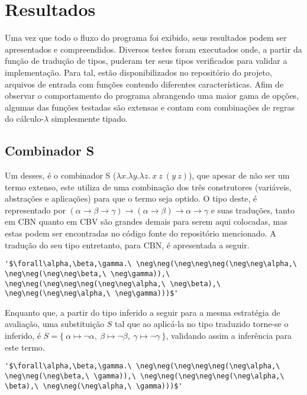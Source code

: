 \section{Resultados}\label{sec:resultados}
Uma vez que todo o fluxo do programa foi exibido, seus resultados podem ser apresentados e compreendidos.
Diversos testes foram executados onde, a partir da função de tradução de tipos, puderam ter seus tipos verificados para validar a implementação.
Para tal, estão disponibilizados no repositório do projeto, arquivos de entrada com funções contendo diferentes características.
Afim de observar o comportamento do programa abrangendo uma maior gama de opções, algumas das funções testadas são extensas e contam com combinações de regras do cálculo-$\lambda$ simplesmente tipado.

\subsection{Combinador S}
Um desses, é o combinador S ($\lambda x.\lambda y.\lambda z.\ x\ z\ (y\ z)$), que apesar de não ser um termo extenso, este utiliza de uma combinação dos três construtores (variáveis, abstrações e aplicações) para que o termo seja optido.
O tipo deste, é representado por $(\alpha \to \beta \to \gamma) \to (\alpha \to \beta) \to \alpha \to \gamma$ e suas traduções, tanto em CBN quanto em CBV são grandes demais para serem aqui colocadas, mas estas podem ser encontradas no código fonte do repositório mencionado.
A tradução do seu tipo entretanto, para CBN, é apresentada a seguir.
\lstset{extendedchars=false, escapeinside=''}
\begin{lstlisting}[style=output,caption={Tradução em CBN do tipo do combinador S}]
  '$\forall\alpha,\beta,\gamma.\ \neg\neg(\neg\neg\neg(\neg\neg\alpha,\ \neg\neg(\neg\neg\beta,\ \neg\gamma)),\ \neg\neg(\neg\neg\neg(\neg\neg\alpha,\ \neg\beta),\ \neg\neg(\neg\neg\alpha,\ \neg\gamma)))$'
\end{lstlisting}
Enquanto que, a partir do tipo inferido a seguir para a mesma estratégia de avaliação, uma substituição $S$ tal que ao aplicá-la no tipo traduzido torne-se o inferido, é $S = \{\ \alpha \mapsto \neg\alpha,\ \beta \mapsto \neg\beta,\ \gamma \mapsto \neg\gamma\ \}$, validando assim a inferência para este termo.
\lstset{extendedchars=false, escapeinside=''}
\begin{lstlisting}[style=output,caption={Inferência do tipo do combinador S traduzido em CBN}]
  '$\forall\alpha,\beta,\gamma.\ \neg\neg(\neg\neg\neg(\neg\alpha,\ \neg\neg(\neg\beta,\ \gamma)),\ \neg\neg(\neg\neg\neg(\neg\alpha,\ \beta),\ \neg\neg(\neg\alpha,\ \gamma)))$'
\end{lstlisting}
